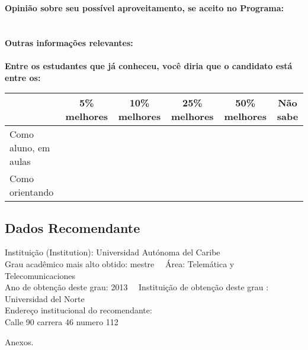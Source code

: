 \documentclass[11pt]{article}
\begin{document}
\textbf{Opinião sobre seu possível aproveitamento, se aceito no Programa:}
\\\\ 
\\
\textbf{Outras informações relevantes:} \\
\\[0.3cm]
\textbf{Entre os estudantes que já conheceu, você diria que o candidato está entre os:}
\\
\begin{tabular}{|l|c|c|c|c|c|}
\hline
 & 5\% melhores & 10\% melhores & 25\% melhores & 50\% melhores & Não sabe \\
\hline
Como aluno, em aulas &  &  &  &  & \\
\hline
Como orientando &  &  &  &  & \\
\hline
\end{tabular}
\subsection*{Dados Recomendante} 
	Instituição (Institution): Universidad Autónoma del Caribe
\\ 
	Grau acadêmico mais alto obtido: mestre
	\ \ Área: Telemática y Telecomunicaciones
	\\
	Ano de obtenção deste grau: 2013
	\ \ 
	Instituição de obtenção deste grau : Universidad del Norte
	\\ 
	Endereço institucional do recomendante: \\ Calle 90 carrera 46 numero 112 
\begin{center}
Anexos.
\end{center}
\end{document}
